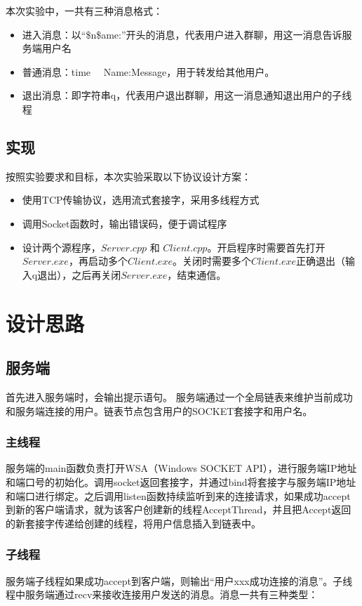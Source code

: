 \documentclass[UTF8,a4paper,10pt]{ctexart}
\begin{document}
\vspace{0.5cm}
本次实验中，一共有三种消息格式：
\begin{itemize}
\item 进入消息：以“\$n\$ame:”开头的消息，代表用户进入群聊，用这一消息告诉服务端用户名
\item 普通消息：time \ \ Name:Message，用于转发给其他用户。
\item 退出消息：即字符串q，代表用户退出群聊，用这一消息通知退出用户的子线程

\end{itemize}
\subsection{实现}
 按照实验要求和目标，本次实验采取以下协议设计方案：
\begin{itemize}
\item 使用TCP传输协议，选用流式套接字，采用多线程方式
\item 调用Socket函数时，输出错误码，便于调试程序
\item 设计两个源程序，$Server.cpp$ 和 $Client.cpp$。开启程序时需要首先打开$Server.exe$，再启动多个$Client.exe$。关闭时需要多个$Client.exe$正确退出（输入q退出），之后再关闭$Server.exe$，结束通信。
\end{itemize}


\section{设计思路}

\subsection{服务端}
首先进入服务端时，会输出提示语句。
服务端通过一个全局链表来维护当前成功和服务端连接的用户。链表节点包含用户的SOCKET套接字和用户名。

\subsubsection{主线程}
服务端的main函数负责打开WSA（Windows SOCKET API），进行服务端IP地址和端口号的初始化。调用socket返回套接字，并通过bind将套接字与服务端IP地址和端口进行绑定。之后调用listen函数持续监听到来的连接请求，如果成功accept到新的客户端请求，就为该客户创建新的线程AcceptThread，并且把Accept返回的新套接字传递给创建的线程，将用户信息插入到链表中。

\subsubsection{子线程}
服务端子线程如果成功accept到客户端，则输出“用户xxx成功连接的消息”。子线程中服务端通过recv来接收连接用户发送的消息。消息一共有三种类型：
\end{document}
